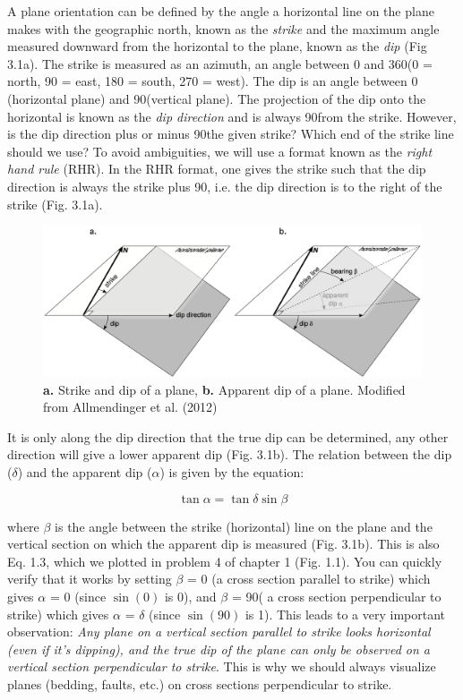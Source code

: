 \documentclass[a4paper , 12pt]{book}
\begin{document}
A plane orientation can be defined by the angle a horizontal line on the plane makes with the geographic north, known as the \textit{strike} and the maximum angle measured downward from the horizontal to the plane, known as the \textit{dip} (Fig 3.1a). The strike is measured as an azimuth, an angle between 0 and  360\degree (0 = north, 90 = east, 180 = south, 270 = west). The dip is an angle between 0 (horizontal plane) and 90\degree (vertical plane). The projection of the dip onto the horizontal is known as the \textit{dip direction} and is always 90\degree from the strike. However, is the dip direction plus or minus 90\degree the given strike? Which end of the strike line should we use? To avoid ambiguities, we will use a format known as the \textit{right hand rule} (RHR). In the RHR format, one gives the strike such that the dip direction is always the strike plus 90\degree, i.e. the dip direction is to the right of the strike (Fig. 3.1a).

\begin{figure}[ht]
    \centering
    \includegraphics[width=13cm]{Figures/ch3f1.png}
    \caption{\textbf{a.} Strike and dip of a plane, \textbf{b.} Apparent dip of a plane. Modified from Allmendinger et al. (2012)}
\end{figure}

It is only along the dip direction that the true dip can be determined, any other direction will give a lower apparent dip (Fig. 3.1b). The relation between the dip ($\delta$) and the apparent dip ($\alpha$) is given by the equation:

\begin{equation}
    \tan\alpha=\tan\delta\sin\beta
\end{equation}

where $\beta$ is the angle between the strike (horizontal) line on the plane and the vertical section on which the apparent dip is measured (Fig. 3.1b). This is also Eq. 1.3, which we plotted in problem 4 of chapter 1 (Fig. 1.1). You can quickly verify that it works by setting $\beta$ = 0 (a cross section parallel to strike) which gives $\alpha$ = 0 (since $\sin(0)$ is 0), and $\beta$ = 90\degree ( a cross section perpendicular to strike) which gives $\alpha$ = $\delta$ (since $\sin (90)$ is 1). This leads to a very important observation: \textit{Any plane on a vertical section parallel to strike looks horizontal (even if it’s dipping), and the true dip of the plane can only be observed on a vertical section perpendicular to strike}. This is why we should always visualize planes (bedding, faults, etc.) on cross sections perpendicular to strike.
\end{document}
